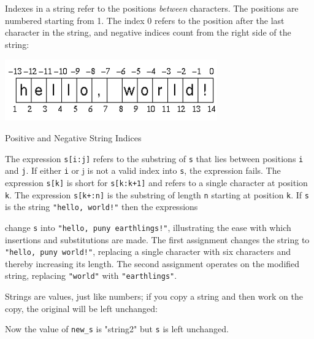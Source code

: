 Indexes in a string refer to the positions
{\em between\/} characters. The positions are numbered starting from 1. The
index 0 refers to the position after the last character in the string,
and negative indices count from the right side of the string:


\begin{center}
\includegraphics[width=3.6075in,height=1.0417in]{ub-img/ub-img7.png}
\end{center}
\vspace{-0.25cm}{\sffamily\bfseries Figure 3-1:}
{\sffamily Positive and Negative String Indices}

\bigskip

The expression \texttt{s[i:j]} refers to the
substring of \texttt{s} that lies between positions
\texttt{i} and \texttt{j}. If either \texttt{i} or j is not a valid
index into \texttt{s}, the expression fails. The expression
\texttt{s[k]} is short for \texttt{s[k:k+1]} and refers to a single
character at position \texttt{k}. The expression
\texttt{s[k+:n]} is the substring of length \texttt{n} starting at
position \texttt{k}. If \texttt{s} is the string
\texttt{"hello, world!"} then the
expressions


\noindent
change \texttt{s} into \texttt{"hello, puny
earthlings!"}, illustrating the ease with which
insertions and substitutions are made. The first assignment changes the
string to \texttt{"hello, puny world!"},
replacing a single character with six characters and thereby increasing
its length. The second assignment operates on the modified string,
replacing \texttt{"world"} with
\texttt{"earthlings"}.

Strings are values, just like numbers; if you copy a string and then
work on the copy, the original will be left unchanged:


Now the value of \texttt{new\_s} is
"string2" but \texttt{s} is left unchanged.

